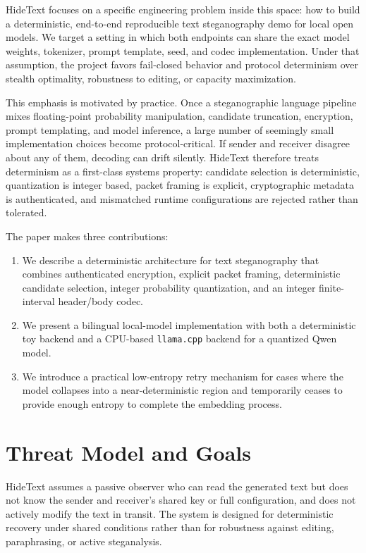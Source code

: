 \documentclass[sigconf,review,anonymous]{acmart}
\begin{document}
HideText focuses on a specific engineering problem inside this space: how to build a deterministic, end-to-end reproducible text steganography demo for local open models. We target a setting in which both endpoints can share the exact model weights, tokenizer, prompt template, seed, and codec implementation. Under that assumption, the project favors fail-closed behavior and protocol determinism over stealth optimality, robustness to editing, or capacity maximization.

This emphasis is motivated by practice. Once a steganographic language pipeline mixes floating-point probability manipulation, candidate truncation, encryption, prompt templating, and model inference, a large number of seemingly small implementation choices become protocol-critical. If sender and receiver disagree about any of them, decoding can drift silently. HideText therefore treats determinism as a first-class systems property: candidate selection is deterministic, quantization is integer based, packet framing is explicit, cryptographic metadata is authenticated, and mismatched runtime configurations are rejected rather than tolerated.

The paper makes three contributions:

\begin{enumerate}
    \item We describe a deterministic architecture for text steganography that combines authenticated encryption, explicit packet framing, deterministic candidate selection, integer probability quantization, and an integer finite-interval header/body codec.
    \item We present a bilingual local-model implementation with both a deterministic toy backend and a CPU-based \texttt{llama.cpp} backend for a quantized Qwen model.
    \item We introduce a practical low-entropy retry mechanism for cases where the model collapses into a near-deterministic region and temporarily ceases to provide enough entropy to complete the embedding process.
\end{enumerate}

\section{Threat Model and Goals}

HideText assumes a passive observer who can read the generated text but does not know the sender and receiver's shared key or full configuration, and does not actively modify the text in transit. The system is designed for deterministic recovery under shared conditions rather than for robustness against editing, paraphrasing, or active steganalysis.
\end{document}
